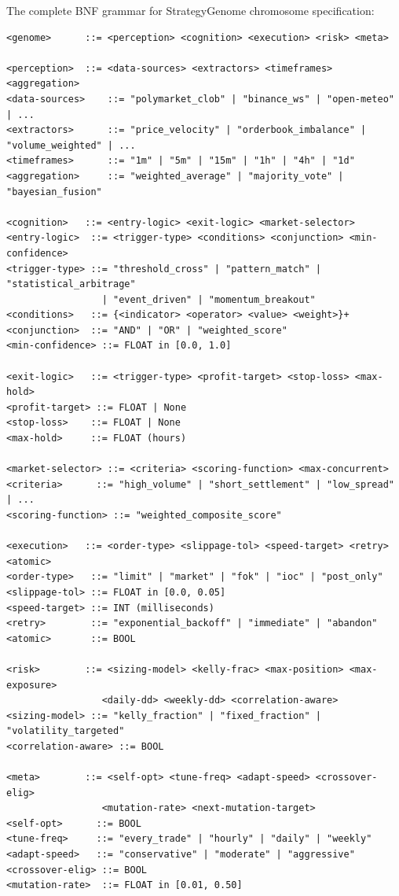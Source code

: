 \documentclass[11pt]{article}
\begin{document}
The complete BNF grammar for StrategyGenome chromosome specification:

\begin{lstlisting}[language={},caption={StrategyGenome BNF Grammar}]
<genome>      ::= <perception> <cognition> <execution> <risk> <meta>

<perception>  ::= <data-sources> <extractors> <timeframes> <aggregation>
<data-sources>    ::= "polymarket_clob" | "binance_ws" | "open-meteo" | ...
<extractors>      ::= "price_velocity" | "orderbook_imbalance" | "volume_weighted" | ...
<timeframes>      ::= "1m" | "5m" | "15m" | "1h" | "4h" | "1d"
<aggregation>     ::= "weighted_average" | "majority_vote" | "bayesian_fusion"

<cognition>   ::= <entry-logic> <exit-logic> <market-selector>
<entry-logic>  ::= <trigger-type> <conditions> <conjunction> <min-confidence>
<trigger-type> ::= "threshold_cross" | "pattern_match" | "statistical_arbitrage"
                 | "event_driven" | "momentum_breakout"
<conditions>   ::= {<indicator> <operator> <value> <weight>}+
<conjunction>  ::= "AND" | "OR" | "weighted_score"
<min-confidence> ::= FLOAT in [0.0, 1.0]

<exit-logic>   ::= <trigger-type> <profit-target> <stop-loss> <max-hold>
<profit-target> ::= FLOAT | None
<stop-loss>    ::= FLOAT | None
<max-hold>     ::= FLOAT (hours)

<market-selector> ::= <criteria> <scoring-function> <max-concurrent>
<criteria>      ::= "high_volume" | "short_settlement" | "low_spread" | ...
<scoring-function> ::= "weighted_composite_score"

<execution>   ::= <order-type> <slippage-tol> <speed-target> <retry> <atomic>
<order-type>   ::= "limit" | "market" | "fok" | "ioc" | "post_only"
<slippage-tol> ::= FLOAT in [0.0, 0.05]
<speed-target> ::= INT (milliseconds)
<retry>        ::= "exponential_backoff" | "immediate" | "abandon"
<atomic>       ::= BOOL

<risk>        ::= <sizing-model> <kelly-frac> <max-position> <max-exposure>
                 <daily-dd> <weekly-dd> <correlation-aware>
<sizing-model> ::= "kelly_fraction" | "fixed_fraction" | "volatility_targeted"
<correlation-aware> ::= BOOL

<meta>        ::= <self-opt> <tune-freq> <adapt-speed> <crossover-elig>
                 <mutation-rate> <next-mutation-target>
<self-opt>      ::= BOOL
<tune-freq>     ::= "every_trade" | "hourly" | "daily" | "weekly"
<adapt-speed>   ::= "conservative" | "moderate" | "aggressive"
<crossover-elig> ::= BOOL
<mutation-rate>  ::= FLOAT in [0.01, 0.50]
\end{lstlisting}
\end{document}
